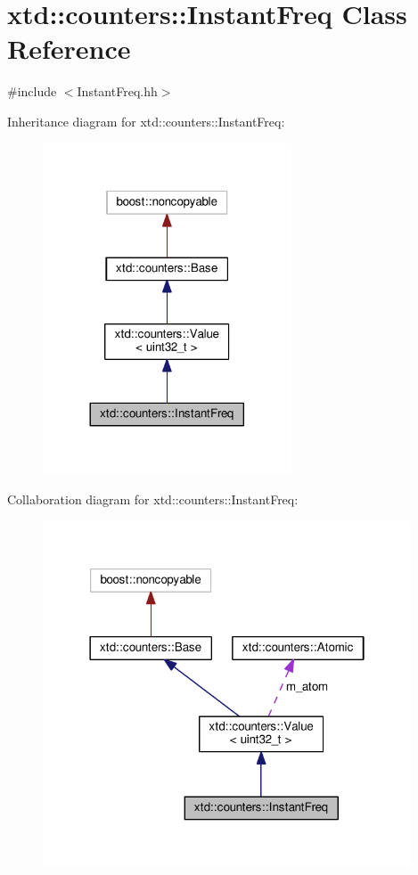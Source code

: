 \hypertarget{classxtd_1_1counters_1_1InstantFreq}{}\section{xtd\+:\+:counters\+:\+:Instant\+Freq Class Reference}
\label{classxtd_1_1counters_1_1InstantFreq}


{\ttfamily \#include $<$Instant\+Freq.\+hh$>$}



Inheritance diagram for xtd\+:\+:counters\+:\+:Instant\+Freq\+:
\nopagebreak
\begin{figure}[H]
\begin{center}
\leavevmode
\includegraphics[width=209pt]{classxtd_1_1counters_1_1InstantFreq__inherit__graph}
\end{center}
\end{figure}


Collaboration diagram for xtd\+:\+:counters\+:\+:Instant\+Freq\+:
\nopagebreak
\begin{figure}[H]
\begin{center}
\leavevmode
\includegraphics[width=310pt]{classxtd_1_1counters_1_1InstantFreq__coll__graph}
\end{center}
\end{figure}
